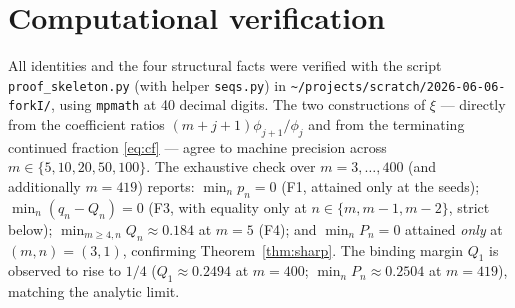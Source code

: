 \documentclass[11pt]{article}
\theoremstyle{definition}
\begin{document}
\section{Computational verification}

All identities and the four structural facts were verified with the script
\texttt{proof\_skeleton.py} (with helper \texttt{seqs.py}) in
\texttt{\~{}/projects/scratch/2026-06-06-forkI/}, using \texttt{mpmath} at 40
decimal digits. The two constructions of $\xi$ --- directly from the coefficient
ratios $(m+j+1)\phi_{j+1}/\phi_j$ and from the terminating continued fraction
\eqref{eq:cf} --- agree to machine precision across $m\in\{5,10,20,50,100\}$.
The exhaustive check over $m=3,\dots,400$ (and additionally $m=419$) reports:
$\min_n p_n=0$ (F1, attained only at the seeds); $\min_n(q_n-Q_n)=0$ (F3, with
equality only at $n\in\{m,m-1,m-2\}$, strict below); $\min_{m\ge4,n}Q_n\approx
0.184$ at $m=5$ (F4); and $\min_n P_n=0$ attained \emph{only} at $(m,n)=(3,1)$,
confirming Theorem~\ref{thm:sharp}. The binding margin $Q_1$ is observed to rise
to $1/4$ ($Q_1\approx0.2494$ at $m=400$; $\min_n P_n\approx0.2504$ at $m=419$),
matching the analytic limit.
\end{document}
